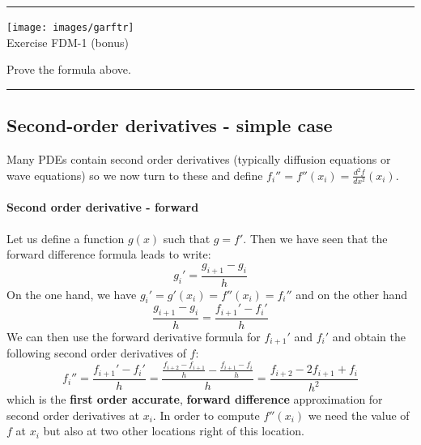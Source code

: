 \begin{center}
\begin{minipage}[t]{0.77\textwidth}
\par\noindent\rule{\textwidth}{0.4pt}

\begin{center}
\texttt{[image: images/garftr]} \\
{\color{orange}Exercise FDM-1 (bonus)}
\end{center}

Prove the formula above.

\par\noindent\rule{\textwidth}{0.4pt}
\end{minipage}
\end{center}


\subsection{Second-order derivatives - simple case}

Many PDEs contain second order derivatives (typically diffusion equations or wave equations)
so we now turn to these and 
define $f_i''=f''(x_i) = \frac{d^2 f}{d x^2} (x_i)$. 

\paragraph{Second order derivative - forward} 
Let us define a function $g(x)$ such that $g=f'$. Then we have seen that the forward 
difference formula leads to write: 
\begin{equation}
g_i' = \frac{g_{i+1}-g_{i}}{h}
\end{equation}
On the one hand, we have $g_i'=g'(x_i)=f''(x_i)=f_i''$ and on the other hand
\begin{equation}
\frac{g_{i+1}-g_{i}}{h} = \frac{f_{i+1}'-f_{i}'}{h}
\end{equation}
We can then use the forward derivative formula for $f_{i+1}'$ and $f_{i}'$ and 
obtain the following second order derivatives of $f$:
\begin{equation}
f_{i}'' 
= \frac{f_{i+1}'-f_i'}{h} 
= \frac{\frac{f_{i+2}-f_{i+1}}{h}-
\frac{f_{i+1}-f_i}{h}
}{h} 
= \frac{f_{i+2}-2f_{i+1}+f_i}{h^2} 
\end{equation}
which is the {\bf first order accurate}, {\bf forward difference} approximation for
second order derivatives at $x_{i}$.
In order to compute $f''(x_i)$ we need the value of $f$ at $x_i$ but also at two 
other locations right of this location.

